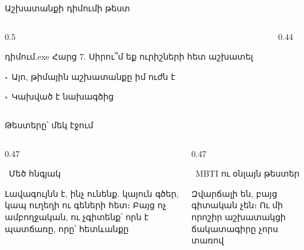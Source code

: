 \begin{frame}{Աշխատանքի դիմումի թեստ}
  \begin{columns}[c]
    \begin{column}{0.5\textwidth}
      \begin{popup}{դիմում.exe}
        {\blackfont Հարց 7. Սիրու՞մ եք ուրիշների հետ աշխատել}\par\medskip
        $\square$\ Այո, թիմային աշխատանքը իմ ուժն է\par\smallskip
        $\square$\ Կախված է նախագծից\par\smallskip
      \end{popup}
    \end{column}
    \begin{column}{0.44\textwidth}
    \end{column}
  \end{columns}
\end{frame}

\begin{frame}{Թեստերը՝ մեկ էջում}
  \begin{columns}[T]
    \begin{column}{0.47\textwidth}
      \begin{card}[colback=mint!35!cardwhite]
        \ {\blackfont Մեծ հնգյակ}\par\smallskip
        Լավագույնն է, ինչ ունենք. կայուն գծեր, կապ ուղեղի ու գեների հետ։ Բայց ոչ ամբողջական, ու չգիտենք՝ որն է պատճառը, որը՝ հետևանքը
      \end{card}
    \end{column}
    \begin{column}{0.47\textwidth}
      \begin{card}[colback=brainpink!25!cardwhite]
        \ {\blackfont MBTI ու օնլայն թեստեր}\par\smallskip
        Զվարճալի են, բայց գիտական չեն։ Ու մի որոշիր աշխատակցի ճակատագիրը չորս տառով
      \end{card}
    \end{column}
  \end{columns}
  \vspace{3mm}
\end{frame}

